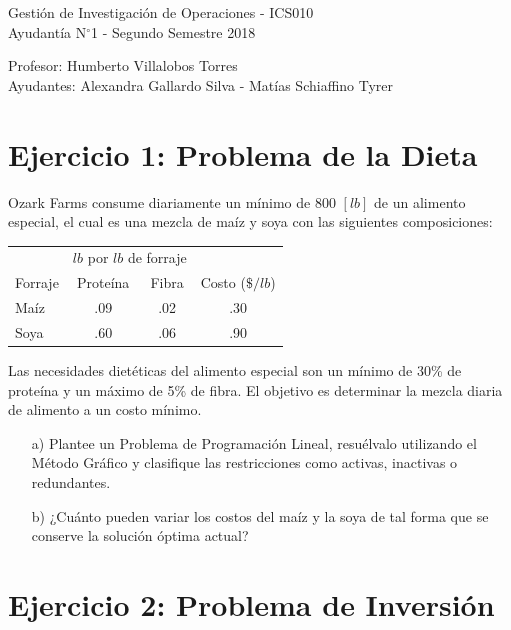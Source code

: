 \documentclass[letterpaper,11pt,oneside]{article}
\newcommand{\grad}{$^{\circ}$}
\begin{document}
	\begin{center}
		{\Large Gestión de Investigación de Operaciones - ICS010}\\
		{\large Ayudantía N\grad 1 - Segundo Semestre 2018}
	\end{center}

	\begin{center}
		Profesor: Humberto Villalobos Torres\\
		Ayudantes: Alexandra Gallardo Silva - Matías Schiaffino Tyrer
	\end{center}

\section*{Ejercicio 1: Problema de la Dieta}

Ozark Farms consume diariamente un mínimo de 800 $[lb]$ de un alimento especial, el cual es una mezcla de maíz y soya con las siguientes composiciones:

\begin{table}[htb]
	\centering
	\begin{tabular}{l c c c}
		\hline\hline
		& \multicolumn{2}{c}{$lb$ por $lb$ de forraje} & \\
		\cline{2-3}
		Forraje & Proteína & Fibra & Costo ($\$/lb$)\\
		\hline
		Maíz & .09 & .02 & .30\\
		Soya & .60 & .06 & .90\\
		\hline\hline
	\end{tabular}
\end{table}

Las necesidades dietéticas del alimento especial son un mínimo de 30\% de proteína y un máximo de 5\% de fibra. El objetivo es determinar la mezcla diaria de alimento a un costo mínimo.

\begin{itemize}
	\item[a)] Plantee un Problema de Programación Lineal, resuélvalo utilizando el Método Gráfico y clasifique las restricciones como activas, inactivas o redundantes.
	\item[b)] ¿Cuánto pueden variar los costos del maíz y la soya de tal forma que se conserve la solución óptima actual?
\end{itemize}

\section*{Ejercicio 2: Problema de Inversión}
\end{document}
